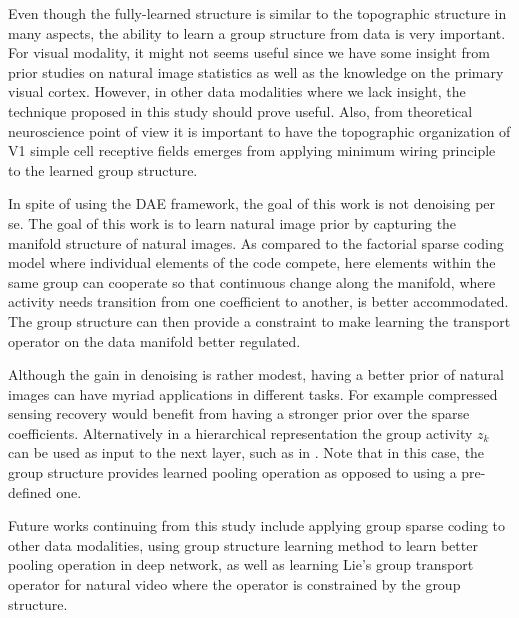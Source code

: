 Even though the fully-learned structure is similar to the topographic structure in many aspects, the ability to learn a group structure from data is very important. For visual modality, it might not seems useful since we have some insight from prior studies on natural image statistics as well as the knowledge on the primary visual cortex. However, in other data modalities where we lack insight, the technique proposed in this study should prove useful. Also, from theoretical neuroscience point of view it is important to have the topographic organization of V1 simple cell receptive fields emerges from applying minimum wiring principle to the learned group structure.

In spite of using the DAE framework, the goal of this work is not denoising per se. The goal of this work is to learn natural image prior by capturing the manifold structure of natural images. As compared to the factorial sparse coding model where individual elements of the code compete, here elements within the same group can cooperate so that continuous change along the manifold, where activity needs transition from one coefficient to another, is better accommodated. The group structure can then provide a constraint to make learning the transport operator on the data manifold \cite{cb09, sj10} better regulated. 

Although the gain in denoising is rather modest, having a better prior of natural images can have myriad applications in different tasks.  For example compressed sensing recovery would benefit from having a stronger prior over the sparse coefficients.  Alternatively in a hierarchical representation the group activity $z_k$ can be used as input to the next layer, such as in \textcite{lq2013}. Note that in this case, the group structure provides learned pooling operation as opposed to using a pre-defined one.

Future works continuing from this study include applying group sparse coding to other data modalities, using group structure learning method to learn better pooling operation in deep network, as well as learning Lie's group transport operator for natural video where the operator is constrained by the group structure.

